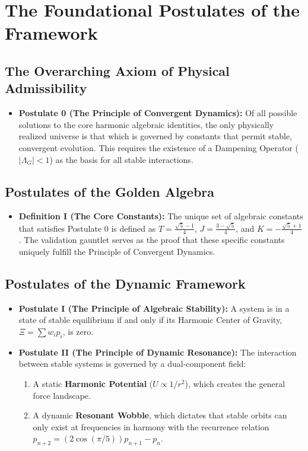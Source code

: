 \documentclass{article}
\begin{document}
\section{The Foundational Postulates of the Framework}

\subsection{The Overarching Axiom of Physical Admissibility}
\begin{itemize}
    \item \textbf{Postulate 0 (The Principle of Convergent Dynamics):} Of all possible solutions to the core harmonic algebraic identities, the only physically realized universe is that which is governed by constants that permit stable, convergent evolution. This requires the existence of a Dampening Operator ($|\Lambda_G| < 1$) as the basis for all stable interactions.
\end{itemize}

\subsection{Postulates of the Golden Algebra}
\begin{itemize}
    \item \textbf{Definition I (The Core Constants):} The unique set of algebraic constants that satisfies Postulate 0 is defined as $T = \frac{\sqrt{5}-1}{4}$, $J = \frac{3-\sqrt{5}}{4}$, and $K = -\frac{\sqrt{5}+1}{4}$. The validation gauntlet serves as the proof that these specific constants uniquely fulfill the Principle of Convergent Dynamics.
\end{itemize}

\subsection{Postulates of the Dynamic Framework}
\begin{itemize}
    \item \textbf{Postulate I (The Principle of Algebraic Stability):} A system is in a state of stable equilibrium if and only if its Harmonic Center of Gravity, $\Xi = \sum w_i p_i$, is zero.
    
    \item \textbf{Postulate II (The Principle of Dynamic Resonance):} The interaction between stable systems is governed by a dual-component field:
    \begin{enumerate}
        \item A static \textbf{Harmonic Potential} ($U \propto 1/r^2$), which creates the general force landscape.
        \item A dynamic \textbf{Resonant Wobble}, which dictates that stable orbits can only exist at frequencies in harmony with the recurrence relation $p_{n+2} = (2\cos(\pi/5))p_{n+1} - p_n$.
    \end{enumerate}
\end{itemize}
\end{document}
